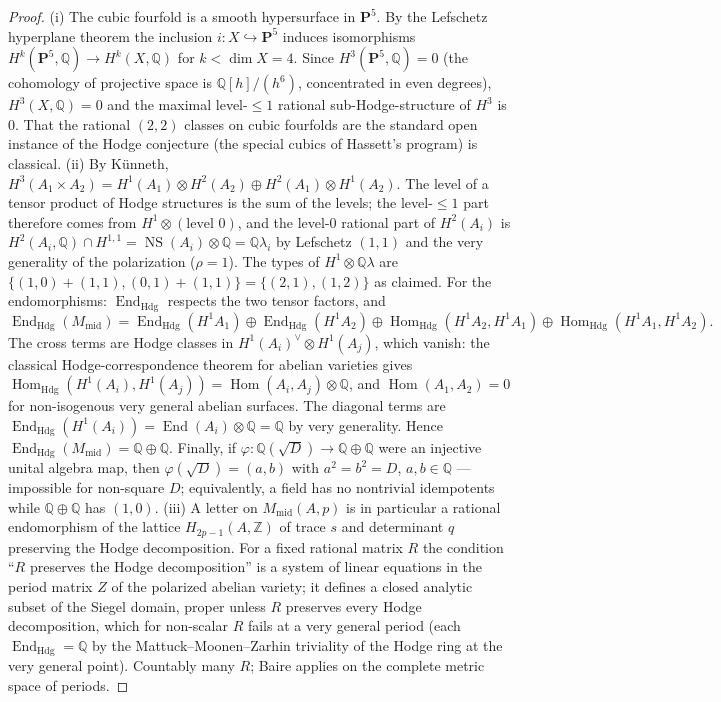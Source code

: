 \documentclass[11pt]{article}
\newcommand{\Z}{\mathbb Z}
\newcommand{\Q}{\mathbb Q}
\newcommand{\End}{\operatorname{End}}
\newcommand{\Hdg}{\operatorname{Hdg}}
\newcommand{\NS}{\operatorname{NS}}
\newcommand{\Hom}{\operatorname{Hom}}
\begin{document}
\begin{proof}
(i) The cubic fourfold is a smooth hypersurface in $\mathbf P^5$. By
the Lefschetz hyperplane theorem the inclusion
$i\colon X\hookrightarrow\mathbf P^5$ induces isomorphisms
$H^k(\mathbf P^5,\Q)\to H^k(X,\Q)$ for $k<\dim X=4$. Since
$H^3(\mathbf P^5,\Q)=0$ (the cohomology of projective space is
$\Q[h]/(h^6)$, concentrated in even degrees), $H^3(X,\Q)=0$ and the
maximal level-$\le 1$ rational sub-Hodge-structure of $H^3$ is $0$.
That the rational $(2,2)$ classes on cubic fourfolds are the standard
open instance of the Hodge conjecture (the special cubics of Hassett's
program) is classical. (ii) By K\"unneth,
$H^3(A_1\times A_2)=H^1(A_1)\otimes H^2(A_2)\oplus H^2(A_1)\otimes
H^1(A_2)$. The level of a tensor product of Hodge structures is the
sum of the levels; the level-$\le 1$ part therefore comes from
$H^1\otimes(\text{level }0)$, and the level-$0$ rational part of
$H^2(A_i)$ is $H^2(A_i,\Q)\cap H^{1,1}=\NS(A_i)\otimes\Q=\Q\lambda_i$
by Lefschetz $(1,1)$ and the very generality of the polarization
($\rho=1$). The types of $H^1\otimes\Q\lambda$ are
$\{(1,0)+(1,1),(0,1)+(1,1)\}=\{(2,1),(1,2)\}$ as claimed. For the
endomorphisms: $\End_{\Hdg}$ respects the two tensor factors, and
\[
\End_{\Hdg}(M_{\mathrm{mid}})=
\End_{\Hdg}(H^1A_1)\oplus\End_{\Hdg}(H^1A_2)\oplus
\Hom_{\Hdg}(H^1A_2,H^1A_1)\oplus\Hom_{\Hdg}(H^1A_1,H^1A_2).
\]
The cross terms are Hodge classes in $H^1(A_i)^\vee\otimes H^1(A_j)$,
which vanish: the classical Hodge-correspondence theorem for abelian
varieties gives $\Hom_{\Hdg}(H^1(A_i),H^1(A_j))=\Hom(A_i,A_j)\otimes\Q$,
and $\Hom(A_1,A_2)=0$ for non-isogenous very general abelian
surfaces. The diagonal terms are
$\End_{\Hdg}(H^1(A_i))=\End(A_i)\otimes\Q=\Q$ by very generality. Hence
$\End_{\Hdg}(M_{\mathrm{mid}})=\Q\oplus\Q$. Finally, if
$\varphi\colon\Q(\sqrt D)\to\Q\oplus\Q$ were an injective unital
algebra map, then $\varphi(\sqrt D)=(a,b)$ with $a^2=b^2=D$,
$a,b\in\Q$ --- impossible for non-square $D$; equivalently, a field has
no nontrivial idempotents while $\Q\oplus\Q$ has $(1,0)$.
(iii) A letter on $M_{\mathrm{mid}}(A,p)$ is in particular a rational
endomorphism of the lattice $H_{2p-1}(A,\Z)$ of trace $s$ and
determinant $q$ preserving the Hodge decomposition. For a fixed
rational matrix $R$ the condition ``$R$ preserves the Hodge
decomposition'' is a system of linear equations in the period matrix
$Z$ of the polarized abelian variety; it defines a closed analytic
subset of the Siegel domain, proper unless $R$ preserves every Hodge
decomposition, which for non-scalar $R$ fails at a very general period
(each $\End_{\Hdg}=\Q$ by the Mattuck--Moonen--Zarhin triviality of
the Hodge ring at the very general point). Countably many $R$; Baire
applies on the complete metric space of periods.
\end{proof}
\end{document}
